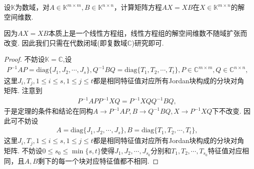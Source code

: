 \documentclass[../../main.tex]{subfiles}%
\begin{document}
\begin{theorem}[交结数]\label{theorem:AX-XB相关命题3}
设$\mathbb{K}$为数域，对$A\in\mathbb{K}^{m\times m}, B\in\mathbb{K}^{n\times n}$，计算矩阵方程$AX = XB$在$X\in\mathbb{K}^{m\times n}$的解空间维数.
\end{theorem}
\begin{remark}
因为$AX = XB$本质上是一个线性方程组，线性方程组的解空间维数不随域扩张而改变. 因此我们只需在代数闭域(即复数域$\mathbb{C}$)研究即可.
\end{remark}
\begin{proof}

不妨设$\mathbb{K}=\mathbb{C}$,设
\begin{align*}
P^{-1}AP = \mathrm{diag}\{J_1, J_2, \cdots, J_s\}, Q^{-1}BQ = \mathrm{diag}\{T_1, T_2, \cdots, T_t\}, P\in\mathbb{C}^{m\times m}, Q\in\mathbb{C}^{n\times n},
\end{align*}
这里$J_i, T_j, 1\leqslant i\leqslant s, 1\leqslant j\leqslant t$都是相同特征值对应所有Jordan块构成的分块对角矩阵.
注意到
\begin{align*}
P^{-1}APP^{-1}XQ = P^{-1}XQQ^{-1}BQ,
\end{align*}
于是定理的条件和结论在同构$A\rightarrow P^{-1}AP,B\rightarrow Q^{-1}BQ,X\rightarrow P^{-1}XQ$下不改变. 因此可不妨设
\begin{align*}
A = \mathrm{diag}\{J_1, J_2, \cdots, J_s\}, B = \mathrm{diag}\{T_1, T_2, \cdots, T_t\},
\end{align*}
这里$J_i, T_j, 1\leqslant i\leqslant s, 1\leqslant j\leqslant t$都是相同特征值对应所有Jordan块构成的分块对角矩阵. 不妨设$0\leqslant s_0\leqslant\min\{s, t\}$使得$J_1, J_2, \cdots, J_{s_0}$分别和$T_1, T_2, \cdots, T_{s_0}$特征值对应相同，且$A, B$剩下的每一个块对应特征值都不相同.


\end{proof}
\end{document}
